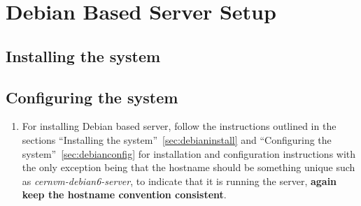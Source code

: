 \section{Debian Based Server Setup}
\subsection{Installing the system}
\subsection{Configuring the system}
\flushleft
\begin{enumerate}
\item 	For installing Debian based server, follow the instructions outlined in the sections ``Installing the 
		system''~\ref{sec:debianinstall} and ``Configuring the system''~\ref{sec:debianconfig} for installation and configuration 
		instructions with the only exception being that the hostname should be something unique such as \emph{cernvm-debian6-server}, to 
		indicate that it is running the \tapper server, {\bf again keep the hostname convention consistent}.
\end{enumerate}


